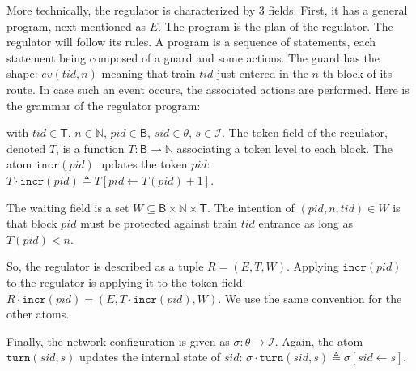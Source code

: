 \documentclass[runningheads]{llncs}
\newcommand{\Nat}{{\mbox{$\mathbb{N}$}}}
\newcommand{\turnouts}{{\mathsf{\theta}}}
\newcommand{\blocks}{{\mathsf{B}}}
\newcommand{\internalState}{{\mathcal{I}}}
\newcommand{\incr}{{\mbox{$\mathtt{incr}$}}\xspace}
\newcommand{\turn}{{\mbox{$\mathtt{turn}$}}\xspace}
\newcommand{\trains}{{\mathsf{T}}}
\begin{document}
More technically, the regulator is characterized by 3 fields. First, it has a general program, next mentioned as $E$. The program is the plan of the regulator. The regulator will follow its rules. A program is a sequence of statements, each statement being composed of a guard and some actions. The guard has the shape: $ev(tid, n)$ meaning that train $tid$ just entered in the $n$-th block of its route. In case such an event occurs, the associated actions are performed. Here is the grammar of the regulator program:

\begin{grammar}
    \firstcasesubtil{atom}{\incr(pid)}{}
    \otherform{\turn(sid, s)}{}
 \end{grammar}
with $tid \in \trains$, $n \in  \Nat$, $pid \in \blocks$, $sid \in \turnouts$, $s\in \internalState$.  
The token field of the regulator, denoted $T$, is a function  $T: \blocks \to \Nat$ associating a token level to each block.  The atom $\incr(pid)$ updates the token $pid$:  $T \cdot \incr(pid)  \triangleq T[pid \leftarrow T(pid)+1]$.

The waiting field is a set $W \subseteq \blocks \times \Nat \times \trains$. The intention of $(pid, n, tid) \in W$  is that block $pid$ must be protected against train $tid$ entrance as long as $T(pid) < n$. 
 

So, the regulator is described as a tuple $R = (E, T, W)$. Applying $\incr(pid)$ to the regulator is applying it to the token field: $R \cdot \incr(pid) = (E, T \cdot \incr(pid), W)$. We use the same convention for the other atoms. 

Finally, the network configuration is given as  $\sigma: \turnouts \to \internalState$. Again, the atom $\turn(sid,s)$ updates the internal state of $sid$: $\sigma \cdot \turn(sid,s) \triangleq \sigma[sid \leftarrow s]$. 




\end{document}
